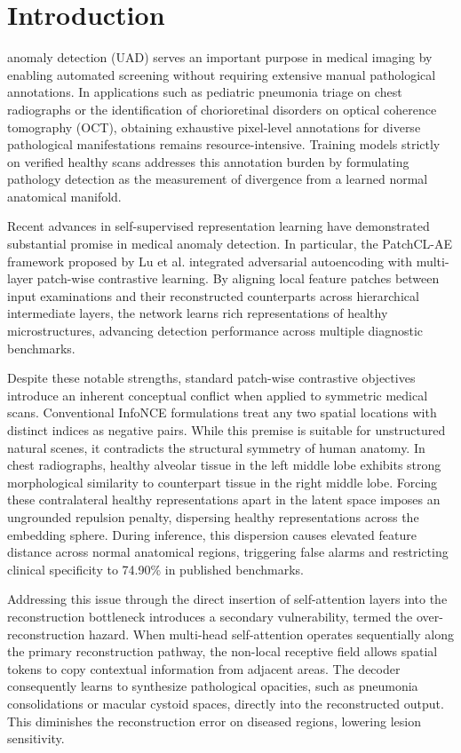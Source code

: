 \documentclass[journal]{IEEEtran}
\begin{document}
\section{Introduction}
 anomaly detection (UAD) serves an important purpose in medical imaging by enabling automated screening without requiring extensive manual pathological annotations. In applications such as pediatric pneumonia triage on chest radiographs or the identification of chorioretinal disorders on optical coherence tomography (OCT), obtaining exhaustive pixel-level annotations for diverse pathological manifestations remains resource-intensive. Training models strictly on verified healthy scans addresses this annotation burden by formulating pathology detection as the measurement of divergence from a learned normal anatomical manifold.

Recent advances in self-supervised representation learning have demonstrated substantial promise in medical anomaly detection. In particular, the PatchCL-AE framework proposed by Lu et al. integrated adversarial autoencoding with multi-layer patch-wise contrastive learning. By aligning local feature patches between input examinations and their reconstructed counterparts across hierarchical intermediate layers, the network learns rich representations of healthy microstructures, advancing detection performance across multiple diagnostic benchmarks.

Despite these notable strengths, standard patch-wise contrastive objectives introduce an inherent conceptual conflict when applied to symmetric medical scans. Conventional InfoNCE formulations treat any two spatial locations with distinct indices as negative pairs. While this premise is suitable for unstructured natural scenes, it contradicts the structural symmetry of human anatomy. In chest radiographs, healthy alveolar tissue in the left middle lobe exhibits strong morphological similarity to counterpart tissue in the right middle lobe. Forcing these contralateral healthy representations apart in the latent space imposes an ungrounded repulsion penalty, dispersing healthy representations across the embedding sphere. During inference, this dispersion causes elevated feature distance across normal anatomical regions, triggering false alarms and restricting clinical specificity to 74.90\% in published benchmarks.

Addressing this issue through the direct insertion of self-attention layers into the reconstruction bottleneck introduces a secondary vulnerability, termed the over-reconstruction hazard. When multi-head self-attention operates sequentially along the primary reconstruction pathway, the non-local receptive field allows spatial tokens to copy contextual information from adjacent areas. The decoder consequently learns to synthesize pathological opacities, such as pneumonia consolidations or macular cystoid spaces, directly into the reconstructed output. This diminishes the reconstruction error on diseased regions, lowering lesion sensitivity.
\end{document}
